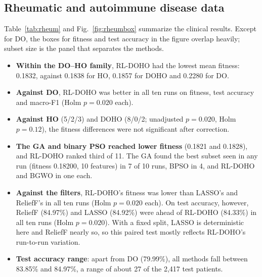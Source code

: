 \documentclass[pdflatex,sn-basic]{sn-jnl}
\begin{document}
\subsection{Rheumatic and autoimmune disease data}
Table~\ref{tab:rheum} and Fig.~\ref{fig:rheumbox} summarize the clinical results. Except for DO, the boxes for fitness and test accuracy in the figure overlap heavily; subset size is the panel that separates the methods.
\begin{itemize}
\item \textbf{Within the DO--HO family}, RL-DOHO had the lowest mean fitness: 0.1832, against 0.1838 for HO, 0.1857 for DOHO and 0.2280 for DO.
\item \textbf{Against DO}, RL-DOHO was better in all ten runs on fitness, test accuracy and macro-F1 (Holm $p=0.020$ each).
\item \textbf{Against HO} (5/2/3) and DOHO (8/0/2; unadjusted $p=0.020$, Holm $p=0.12$), the fitness differences were not significant after correction.
\item \textbf{The GA and binary PSO reached lower fitness} (0.1821 and 0.1828), and RL-DOHO ranked third of 11. The GA found the best subset seen in any run (fitness 0.18200, 10 features) in 7 of 10 runs, BPSO in 4, and RL-DOHO and BGWO in one each.
\item \textbf{Against the filters}, RL-DOHO's fitness was lower than LASSO's and ReliefF's in all ten runs (Holm $p=0.020$ each). On test accuracy, however, ReliefF (84.97\%) and LASSO (84.92\%) were ahead of RL-DOHO (84.33\%) in all ten runs (Holm $p=0.020$). With a fixed split, LASSO is deterministic here and ReliefF nearly so, so this paired test mostly reflects RL-DOHO's run-to-run variation.
\item \textbf{Test accuracy range}: apart from DO (79.99\%), all methods fall between 83.85\% and 84.97\%, a range of about 27 of the 2,417 test patients.
\end{itemize}
\end{document}
